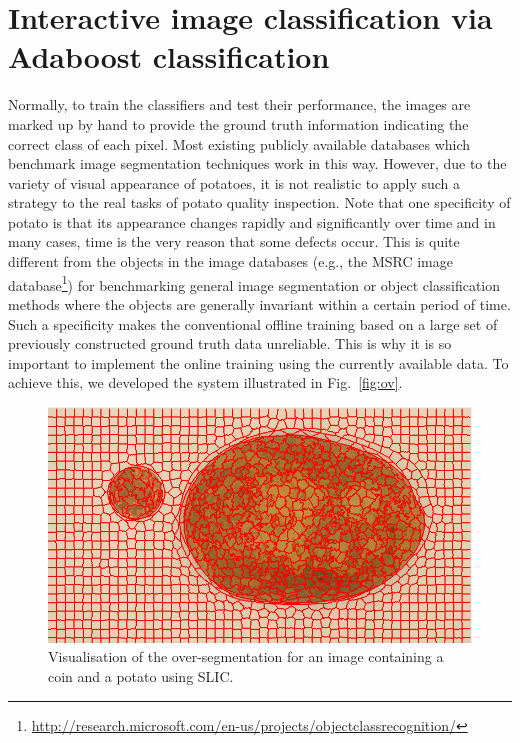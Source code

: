 \documentclass[twocolumn]{svjour3}          %
\begin{document}
\section{Interactive image classification via Adaboost classification}
Normally, to train the classifiers and test their performance, the images are marked up by hand to provide the ground truth information indicating the correct class of each pixel. Most existing publicly available databases which benchmark image segmentation techniques work in this way. However, due to the variety of visual appearance of potatoes, it is not realistic to apply such a strategy to the real tasks of potato quality inspection. Note that one specificity of potato is that its appearance changes rapidly and significantly over time and in many cases, time is the very reason that some defects occur. This is quite different from the objects in the image databases (e.g., the MSRC image database\footnote{\url{http://research.microsoft.com/en-us/projects/objectclassrecognition/}}) for benchmarking general image segmentation or object classification methods where the objects are generally invariant within a certain period of time. Such a specificity makes the conventional offline training based on a large set of previously constructed ground truth data unreliable. This is why it is so important to implement the online training using the currently available data. To achieve this, we developed the system illustrated in Fig.~\ref{fig:ov}. 
\begin{figure}[t]
\centering
\includegraphics[width=1\linewidth]{superpixel.jpg}
\caption{Visualisation of the over-segmentation for an image containing a coin and a potato using SLIC.}
\label{fig:sp}
\end{figure} 
\end{document}
